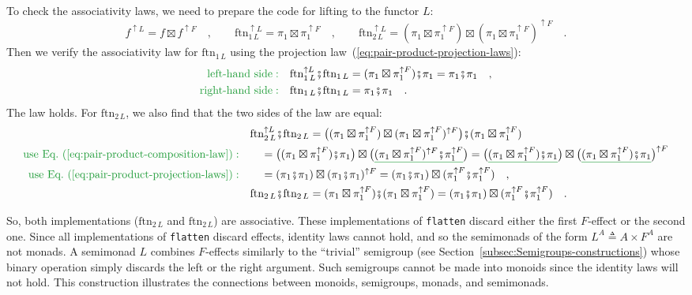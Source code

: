 To check the associativity laws, we need to prepare the code for lifting
to the functor $L$:
\[
f^{\uparrow L}=f\boxtimes f^{\uparrow F}\quad,\quad\quad\text{ftn}_{1\,L}^{\uparrow L}=\pi_{1}\boxtimes\pi_{1}^{\uparrow F}\quad,\quad\quad\text{ftn}_{2\,L}^{\uparrow L}=(\pi_{1}\boxtimes\pi_{1}^{\uparrow F})\boxtimes(\pi_{1}\boxtimes\pi_{1}^{\uparrow F})^{\uparrow F}\quad.
\]
Then we verify the associativity law for $\text{ftn}_{1\,L}$ using
the projection law~(\ref{eq:pair-product-projection-laws}): 
\begin{align*}
{\color{greenunder}\text{left-hand side}:}\quad & \text{ftn}_{1\,L}^{\uparrow L}\bef\text{ftn}_{1\,L}=(\pi_{1}\boxtimes\pi_{1}^{\uparrow F})\bef\pi_{1}=\pi_{1}\bef\pi_{1}\quad,\\
{\color{greenunder}\text{right-hand side}:}\quad & \text{ftn}_{1\,L}\bef\text{ftn}_{1\,L}=\pi_{1}\bef\pi_{1}\quad.
\end{align*}
The law holds. For $\text{ftn}_{2\,L}$, we also find that the two
sides of the law are equal:
\begin{align*}
 & \text{ftn}_{2\,L}^{\uparrow L}\bef\text{ftn}_{2\,L}=\big((\pi_{1}\boxtimes\pi_{1}^{\uparrow F})\boxtimes(\pi_{1}\boxtimes\pi_{1}^{\uparrow F})^{\uparrow F}\big)\bef(\pi_{1}\boxtimes\pi_{1}^{\uparrow F})\\
{\color{greenunder}\text{use Eq.~(\ref{eq:pair-product-composition-law})}:}\quad & \quad=\big((\pi_{1}\boxtimes\pi_{1}^{\uparrow F})\bef\pi_{1}\big)\boxtimes\big(\gunderline{(\pi_{1}\boxtimes\pi_{1}^{\uparrow F})^{\uparrow F}\bef\pi_{1}^{\uparrow F}}\big)=\big(\gunderline{(\pi_{1}\boxtimes\pi_{1}^{\uparrow F})\bef\pi_{1}}\big)\boxtimes\big(\gunderline{(\pi_{1}\boxtimes\pi_{1}^{\uparrow F})\bef\pi_{1}}\big)^{\uparrow F}\\
{\color{greenunder}\text{use Eq.~(\ref{eq:pair-product-projection-laws})}:}\quad & \quad=(\pi_{1}\bef\pi_{1})\boxtimes(\pi_{1}\bef\pi_{1})^{\uparrow F}=(\pi_{1}\bef\pi_{1})\boxtimes(\pi_{1}^{\uparrow F}\bef\pi_{1}^{\uparrow F})\quad,\\
 & \text{ftn}_{2\,L}\bef\text{ftn}_{2\,L}=(\pi_{1}\boxtimes\pi_{1}^{\uparrow F})\bef(\pi_{1}\boxtimes\pi_{1}^{\uparrow F})=(\pi_{1}\bef\pi_{1})\boxtimes(\pi_{1}^{\uparrow F}\bef\pi_{1}^{\uparrow F})\quad.
\end{align*}

So, both implementations ($\text{ftn}_{2\,L}$ and $\text{ftn}_{2\,L}$)
are associative. These implementations of \lstinline!flatten! discard
either the first $F$-effect or the second one. Since all implementations
of \lstinline!flatten! discard effects, identity laws cannot hold,
and so the semimonads of the form $L^{A}\triangleq A\times F^{A}$
are not monads. A semimonad $L$ combines $F$-effects similarly to
the \textsf{``}trivial\textsf{''} semigroup (see Section~\ref{subsec:Semigroups-constructions})
whose binary operation simply discards the left or the right argument.
Such semigroups cannot be made into monoids since the identity laws
will not hold. This construction illustrates the connections between
monoids, semigroups, monads, and semimonads.

